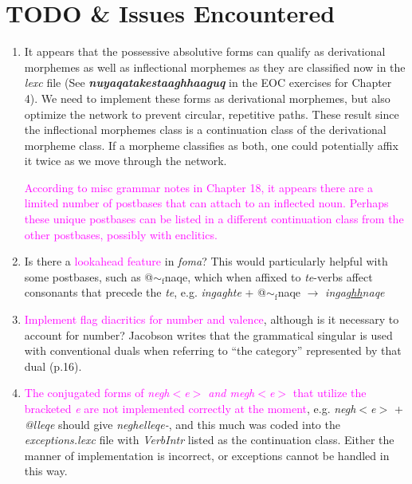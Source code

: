 \documentclass{article}
\begin{document}
\section{TODO \& Issues Encountered}

\begin{enumerate}
\item It appears that the possessive absolutive forms can qualify as derivational morphemes as well as inflectional morphemes as they are classified now in the \textit{lexc} file (See \textit{\textbf{nuyaqatakestaaghhaaguq}} in the EOC exercises for Chapter 4).
%
We need to implement these forms as derivational morphemes, but also optimize the network to prevent circular, repetitive paths.
%
These result since the inflectional morphemes class is a continuation class of the derivational morpheme class.
%
If a morpheme classifies as both, one could potentially affix it twice as we move through the network.

\textcolor{magenta}{According to misc grammar notes in Chapter 18, it appears there are a limited number of postbases that can attach to an inflected noun.
%
Perhaps these unique postbases can be listed in a different continuation class from the other postbases, possibly with enclitics.}

\item Is there a \textcolor{magenta}{lookahead feature} in \textit{foma}? This would particularly helpful with some postbases, such as @${\sim}_\text{f}$naqe, which when affixed to \textit{te}-verbs affect consonants that precede the \textit{te}, e.g. \textit{ingaghte} + @${\sim}_\text{f}$naqe $\rightarrow$ \textit{inga\uline{ghh}naqe}

\item \textcolor{magenta}{Implement flag diacritics for number and valence}, although is it necessary to account for number? Jacobson writes that the grammatical singular is used with conventional duals when referring to ``the category'' represented by that dual (p.16).

\item \textcolor{magenta}{The conjugated forms of \textit{negh$<$e$>$ and megh$<$e$>$} that utilize the bracketed \textit{e} are not implemented correctly at the moment}, e.g. \textit{negh$<$e$>$} + \textit{@lleqe} should give \textit{neghelleqe-}, and this much was coded into the \textit{exceptions.lexc} file with \textit{VerbIntr} listed as the continuation class. Either the manner of implementation is incorrect, or exceptions cannot be handled in this way.


\end{enumerate}
\end{document}
